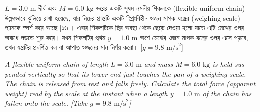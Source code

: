 \documentclass[12pt, a4paper]{article}
\begin{document}
\begin{tcolorbox}[questionbox={প্রশ্ন (Question) 8}]
\noindent
$L = 3.0\text{ m}$ দীর্ঘ এবং $M = 6.0\text{ kg}$ ভরের একটি সুষম নমনীয় শিকলকে (flexible uniform chain) উল্লম্বভাবে ঝুলিয়ে রাখা হয়েছে, যার নিচের প্রান্তটি একটি স্প্রিংবিহীন ওজন মাপক যন্ত্রের (weighing scale) প্যানকে স্পর্শ করে আছে [১৬]। এবার শিকলটিকে স্থির অবস্থা থেকে ছেড়ে দেওয়া হলো যাতে এটি মেঝের ওপর অবাধে পড়তে শুরু করে। যখন শিকলটির প্রথম $y = 1.0\text{ m}$ অংশ মেঝের ওজন মাপক যন্ত্রের ওপর এসে পড়বে, তখন যন্ত্রটির প্রদর্শিত বল বা আপাত ওজনের মান নির্ণয় করো। [$g = 9.8\text{ m/s}^2$]

\vspace{0.8em}
\begin{english}
\noindent\textit{\color{darkgray}
A flexible uniform chain of length $L = 3.0\text{ m}$ and mass $M = 6.0\text{ kg}$ is held suspended vertically so that its lower end just touches the pan of a weighing scale. The chain is released from rest and falls freely. Calculate the total force (apparent weight) read by the scale at the instant when a length $y = 1.0\text{ m}$ of the chain has fallen onto the scale. [Take $g = 9.8\text{ m/s}^2$]
}
\end{english}
\end{tcolorbox}
\end{document}
